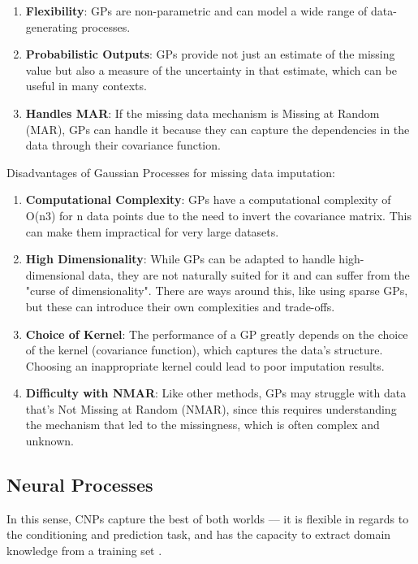 \documentclass[a4paper,12pt,twoside,openright]{report}
\begin{document}
\begin{enumerate}
    \item \textbf{Flexibility}: GPs are non-parametric and can model a wide range of data-generating processes.
    \item \textbf{Probabilistic Outputs}: GPs provide not just an estimate of the missing value but also a measure of the uncertainty in that estimate, which can be useful in many contexts. 
    \item \textbf{Handles MAR}: If the missing data mechanism is Missing at Random (MAR), GPs can handle it because they can capture the dependencies in the data through their covariance function.
\end{enumerate}

Disadvantages of Gaussian Processes for missing data imputation:

\begin{enumerate}
    \item \textbf{Computational Complexity}: GPs have a computational complexity of O(n3) for n data points due to the need to invert the covariance matrix. This can make them impractical for very large datasets.
    \item \textbf{High Dimensionality}: While GPs can be adapted to handle high-dimensional data, they are not naturally suited for it and can suffer from the "curse of dimensionality". There are ways around this, like using sparse GPs, but these can introduce their own complexities and trade-offs.
    \item \textbf{Choice of Kernel}: The performance of a GP greatly depends on the choice of the kernel (covariance function), which captures the data's structure. Choosing an inappropriate kernel could lead to poor imputation results.
    \item \textbf{Difficulty with NMAR}: Like other methods, GPs may struggle with data that's Not Missing at Random (NMAR), since this requires understanding the mechanism that led to the missingness, which is often complex and unknown.
\end{enumerate}

\subsection{Neural Processes}

In this sense, CNPs capture the best of both worlds –-- it is flexible in regards to the conditioning and prediction task, and has the capacity to extract domain knowledge from a training set \parencite{garneloConditionalNeuralProcesses2018}.
\end{document}
